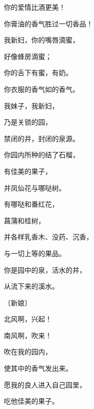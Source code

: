 {\par }{\Q 你的爱情比酒更美！
\par }{\Q 你膏油的香气胜过一切香品！
\par }{\Q {}我新妇，你的嘴唇滴蜜，
\par }{\Q 好像蜂房滴蜜；
\par }{\Q 你的舌下有蜜，有奶。
\par }{\Q 你衣服的香气如{}的香气。
\par }{\Q {}我妹子，我新妇，
\par }{\Q 乃是关锁的园，
\par }{\Q 禁闭的井，封闭的泉源。
\par }{\Q {}你园内所种的结了石榴，
\par }{\Q 有佳美的果子，
\par }{\Q 并凤仙花与哪哒树。
\par }{\Q {}有哪哒和番红花，
\par }{\Q 菖蒲和桂树，
\par }{\Q 并各样乳香木、没药、沉香，
\par }{\Q 与一切上等的果品。
\par }{\Q {}你是园中的泉，活水的井，
\par }{\Q 从{}流下来的溪水。
\par }{\SP 〔新娘〕
\par }{\Q {}北风啊，兴起！
\par }{\Q 南风啊，吹来！
\par }{\Q 吹在我的园内，
\par }{\Q 使其中的香气发出来。
\par }{\Q 愿我的良人进入自己园里，
\par }{\Q 吃他佳美的果子。

}
